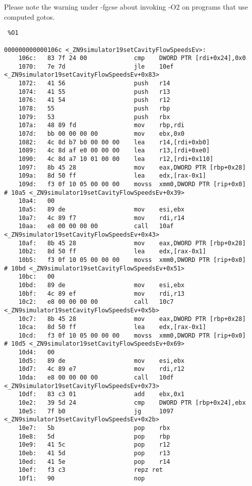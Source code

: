 Please note the warning under -fgcse about invoking -O2 on programs that use computed gotos.



\begin{verbatim} %O1

000000000000106c <_ZN9simulator19setCavityFlowSpeedsEv>:
    106c:   83 7f 24 00             cmp    DWORD PTR [rdi+0x24],0x0
    1070:   7e 7d                   jle    10ef <_ZN9simulator19setCavityFlowSpeedsEv+0x83>
    1072:   41 56                   push   r14
    1074:   41 55                   push   r13
    1076:   41 54                   push   r12
    1078:   55                      push   rbp
    1079:   53                      push   rbx
    107a:   48 89 fd                mov    rbp,rdi
    107d:   bb 00 00 00 00          mov    ebx,0x0
    1082:   4c 8d b7 b0 00 00 00    lea    r14,[rdi+0xb0]
    1089:   4c 8d af e0 00 00 00    lea    r13,[rdi+0xe0]
    1090:   4c 8d a7 10 01 00 00    lea    r12,[rdi+0x110]
    1097:   8b 45 28                mov    eax,DWORD PTR [rbp+0x28]
    109a:   8d 50 ff                lea    edx,[rax-0x1]
    109d:   f3 0f 10 05 00 00 00    movss  xmm0,DWORD PTR [rip+0x0]        # 10a5 <_ZN9simulator19setCavityFlowSpeedsEv+0x39>
    10a4:   00 
    10a5:   89 de                   mov    esi,ebx
    10a7:   4c 89 f7                mov    rdi,r14
    10aa:   e8 00 00 00 00          call   10af <_ZN9simulator19setCavityFlowSpeedsEv+0x43>
    10af:   8b 45 28                mov    eax,DWORD PTR [rbp+0x28]
    10b2:   8d 50 ff                lea    edx,[rax-0x1]
    10b5:   f3 0f 10 05 00 00 00    movss  xmm0,DWORD PTR [rip+0x0]        # 10bd <_ZN9simulator19setCavityFlowSpeedsEv+0x51>
    10bc:   00 
    10bd:   89 de                   mov    esi,ebx
    10bf:   4c 89 ef                mov    rdi,r13
    10c2:   e8 00 00 00 00          call   10c7 <_ZN9simulator19setCavityFlowSpeedsEv+0x5b>
    10c7:   8b 45 28                mov    eax,DWORD PTR [rbp+0x28]
    10ca:   8d 50 ff                lea    edx,[rax-0x1]
    10cd:   f3 0f 10 05 00 00 00    movss  xmm0,DWORD PTR [rip+0x0]        # 10d5 <_ZN9simulator19setCavityFlowSpeedsEv+0x69>
    10d4:   00 
    10d5:   89 de                   mov    esi,ebx
    10d7:   4c 89 e7                mov    rdi,r12
    10da:   e8 00 00 00 00          call   10df <_ZN9simulator19setCavityFlowSpeedsEv+0x73>
    10df:   83 c3 01                add    ebx,0x1
    10e2:   39 5d 24                cmp    DWORD PTR [rbp+0x24],ebx
    10e5:   7f b0                   jg     1097 <_ZN9simulator19setCavityFlowSpeedsEv+0x2b>
    10e7:   5b                      pop    rbx
    10e8:   5d                      pop    rbp
    10e9:   41 5c                   pop    r12
    10eb:   41 5d                   pop    r13
    10ed:   41 5e                   pop    r14
    10ef:   f3 c3                   repz ret 
    10f1:   90                      nop

\end{verbatim} %

